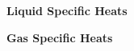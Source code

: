 \begin{center}
\textbf{Liquid Specific Heats}\\ \smallskip


\end{center}

\bigskip

\begin{center}
\textbf{Gas Specific Heats}\\ \smallskip

\end{center}



\bigskip

